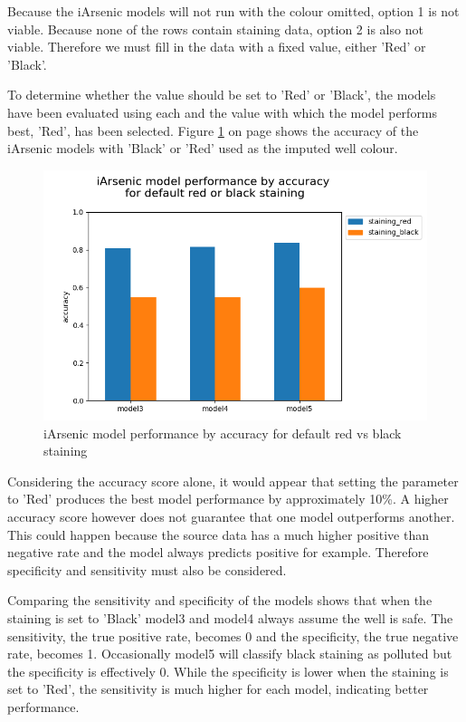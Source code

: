 Because the iArsenic models will not run with the colour omitted, option 1 is not viable. Because none of the rows contain staining data, option 2 is also not viable. Therefore we must fill in the data with a fixed value, either 'Red' or 'Black'.

To determine whether the value should be set to 'Red' or 'Black', the models have been evaluated using each and the value with which the model performs best, 'Red', has been selected. Figure \ref{fig:x ia_model_black_red_accuracy} on page \pageref{fig:x ia_model_black_red_accuracy} shows the accuracy of the iArsenic models with 'Black' or 'Red' used as the imputed well colour.

\begin{figure}[h]
    \centering
    \includegraphics[scale=0.55]{figures/ia_model_black_red_accuracy.png} 
    \caption{iArsenic model performance by accuracy for default red vs black staining}
    \label{fig:x ia_model_black_red_accuracy}
\end{figure}

\newpage

Considering the accuracy score alone, it would appear that setting the parameter to 'Red' produces the best model performance by approximately 10\%. A higher accuracy score however does not guarantee that one model outperforms another. This could happen because the source data has a much higher positive than negative rate and the model always predicts positive for example. Therefore specificity and sensitivity must also be considered.

Comparing the sensitivity and specificity of the models shows that when the staining is set to 'Black' model3 and model4 always assume the well is safe. The sensitivity, the true positive rate, becomes 0 and the specificity, the true negative rate, becomes 1. Occasionally model5 will classify black staining as polluted but the specificity is effectively 0. While the specificity is lower when the staining is set to 'Red', the sensitivity is much higher for each model, indicating better performance.

